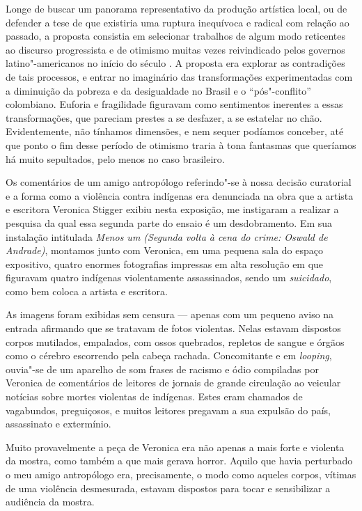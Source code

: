 Longe de buscar um panorama representativo da produção artística local,
ou de defender a tese de que existiria uma ruptura inequívoca e radical
com relação ao passado, a proposta consistia em selecionar trabalhos de
algum modo reticentes ao discurso progressista e de otimismo muitas
vezes reivindicado pelos governos latino"-americanos no início do século
. A proposta era explorar as contradições de tais processos, e entrar
no imaginário das transformações experimentadas com a diminuição da
pobreza e da desigualdade no Brasil e o ``pós"-conflito'' colombiano.
Euforia e fragilidade figuravam como sentimentos inerentes a essas
transformações, que pareciam prestes a se desfazer, a se estatelar no
chão. Evidentemente, não tínhamos dimensões, e nem sequer podíamos
conceber, até que ponto o fim desse período de otimismo traria à tona
fantasmas que queríamos há muito sepultados, pelo menos no caso
brasileiro.

Os comentários de um amigo antropólogo referindo"-se à nossa decisão
curatorial e a forma como a violência contra indígenas era denunciada na
obra que a artista e escritora Veronica Stigger exibiu nesta exposição,
me instigaram a realizar a pesquisa da qual essa segunda parte do ensaio
é um desdobramento. Em sua instalação intitulada \emph{Menos um (Segunda
volta à cena do crime: Oswald de Andrade)}, montamos junto com Veronica,
em uma pequena sala do espaço expositivo, quatro enormes fotografias
impressas em alta resolução em que figuravam quatro indígenas
violentamente assassinados, sendo um \emph{suicidado}, como bem coloca a
artista e escritora.

As imagens foram exibidas sem censura --- apenas com um pequeno aviso na
entrada afirmando que se tratavam de fotos violentas. Nelas estavam
dispostos corpos mutilados, empalados, com ossos quebrados, repletos de
sangue e órgãos como o cérebro escorrendo pela cabeça rachada.
Concomitante e em \emph{looping}, ouvia"-se de um aparelho de som frases
de racismo e ódio compiladas por Veronica de comentários de leitores de
jornais de grande circulação ao veicular notícias sobre mortes violentas
de indígenas. Estes eram chamados de vagabundos, preguiçosos, e muitos
leitores pregavam a sua expulsão do país, assassinato e extermínio.

Muito provavelmente a peça de Veronica era não apenas a mais forte e
violenta da mostra, como também a que mais gerava horror. Aquilo que
havia perturbado o meu amigo antropólogo era, precisamente, o modo como
aqueles corpos, vítimas de uma violência desmesurada, estavam dispostos
para tocar e sensibilizar a audiência da mostra.

